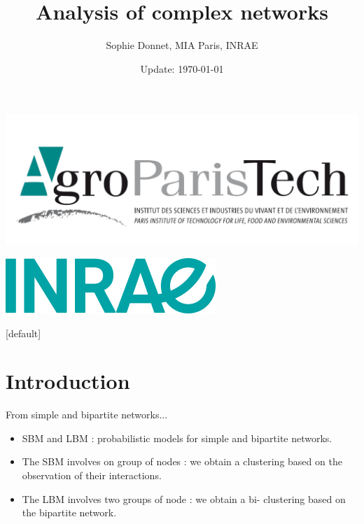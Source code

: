 \documentclass[compress,10pt]{beamer}
\title[Complex networks]{Analysis of complex networks}
\author{Sophie Donnet, MIA Paris, INRAE }
\date{Update:  \today}
\begin{document}

\begin{frame}
\titlepage

\vspace{-.5cm}
\includegraphics[scale=.1]{plots/AgroParisTech_-_logo.PNG}
\vspace{-1.2cm}
\begin{flushright}
 \includegraphics[scale=.3]{plots/Logo-INRAE.jpg}
 \end{flushright}

\end{frame}


[default]

\section[Contexte]{Introduction}


\begin{frame}{From simple and bipartite networks... }

\begin{itemize}
\item SBM and LBM : probabilistic models for simple and bipartite networks.
\item The SBM involves  on group of nodes : we obtain a clustering based on the observation of their interactions.
\item The LBM involves  two groups of node  : we obtain a bi- clustering based on the bipartite network. 
\end{itemize}

\end{frame}
\end{document}
